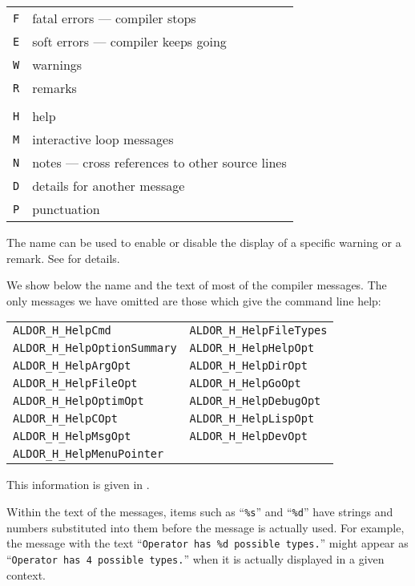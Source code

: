 \vspace{1mm}
\begin{tabular}{@{}ll@{}}
{\tt F}& fatal errors --- compiler stops \\
{\tt E}& soft errors  --- compiler keeps going \\
{\tt W}& warnings \\
{\tt R}& remarks \\
\quad \\
{\tt H}& help \\
{\tt M}& interactive loop messages \\
{\tt N}& notes --- cross references to other source lines \\
{\tt D}& details for another message\\
{\tt P}& punctuation 
\end{tabular}

\vspace{1mm}
The name  can be used to enable or disable the display of a specific
warning or a remark.  
See  for details.

We show below the name and the text of most of the compiler messages.
The only messages we have omitted are those which give the command
line help:
\begin{center}
\begin{tabular}{@{}ll}
{\tt ALDOR\_H\_HelpCmd}            & {\tt ALDOR\_H\_HelpFileTypes} \\
{\tt ALDOR\_H\_HelpOptionSummary}  & {\tt ALDOR\_H\_HelpHelpOpt}   \\
{\tt ALDOR\_H\_HelpArgOpt}         & {\tt ALDOR\_H\_HelpDirOpt}	   \\
{\tt ALDOR\_H\_HelpFileOpt}        & {\tt ALDOR\_H\_HelpGoOpt}	   \\
{\tt ALDOR\_H\_HelpOptimOpt}       & {\tt ALDOR\_H\_HelpDebugOpt}  \\
{\tt ALDOR\_H\_HelpCOpt}       	   & {\tt ALDOR\_H\_HelpLispOpt}   \\
{\tt ALDOR\_H\_HelpMsgOpt}         & {\tt ALDOR\_H\_HelpDevOpt}	   \\
{\tt ALDOR\_H\_HelpMenuPointer}
\end{tabular}
\end{center}
This information is given in .

Within the text of the messages,
items such as ``{\tt \%s}'' and ``{\tt \%d}'' have strings and
numbers substituted into them before the message is actually used.
For example, the message with the text
``{\tt Operator has \%d possible types.}''
might appear as
``{\tt Operator has 4 possible types.}''
when it is actually displayed in a given context.


 
\def\errmsg#1#2{\begin{tabular}{@{}p{48mm}p{68mm}@{}}\raggedright\small\tt
#1&\raggedright{}\small#2\end{tabular}\hfill\newline}



